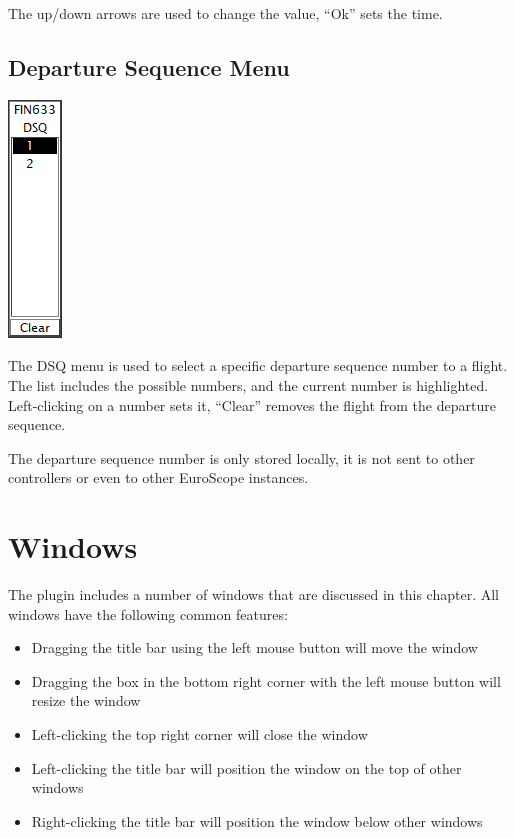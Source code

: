 \documentclass[11pt,a4paper,oldfontcommands]{memoir}
\newenvironment{Note}
  {\begin{shaded}\marginnote{\fbox{Note}}}
  {\end{shaded}}
\begin{document}
The up/down arrows are used to change the value, “Ok” sets the time.

\subsection{Departure Sequence Menu}
\label{dqm}
\includegraphics{img/dsq.png}

The DSQ menu is used to select a specific departure sequence number to a flight. The list includes the possible numbers, and the current number is highlighted. Left-clicking on a number sets it, “Clear” removes the flight from the departure sequence.

\begin{Note}
The departure sequence number is only stored locally, it is not sent to other controllers or even to other EuroScope instances.
\end{Note}

\section{Windows}
The plugin includes a number of windows that are discussed in this chapter. All windows have the following common features:

\begin{itemize}
    \item Dragging the title bar using the left mouse button will move the window
    \item Dragging the box in the bottom right corner with the left mouse button will resize the window
    \item Left-clicking the top right corner will close the window
    \item Left-clicking the title bar will position the window on the top of other windows
    \item Right-clicking the title bar will position the window below other windows
\end{itemize}
\end{document}
